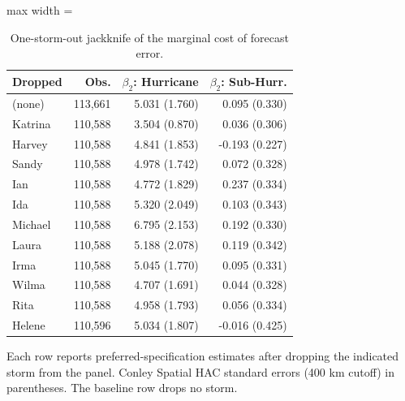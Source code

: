\begin{table}

\caption{One-storm-out jackknife of the marginal cost of forecast error. \label{tab:cost_jackknife}}
\centering
\begin{adjustbox}{max width = \textwidth}
\begin{threeparttable}
\begin{tabular}[t]{lrrr}
\toprule
Dropped & Obs. & $\beta_2$: Hurricane & $\beta_2$: Sub-Hurr.\\
\midrule
(none) & 113,661 & 5.031 (1.760) & 0.095 (0.330)\\
Katrina & 110,588 & 3.504 (0.870) & 0.036 (0.306)\\
Harvey & 110,588 & 4.841 (1.853) & -0.193 (0.227)\\
Sandy & 110,588 & 4.978 (1.742) & 0.072 (0.328)\\
Ian & 110,588 & 4.772 (1.829) & 0.237 (0.334)\\
Ida & 110,588 & 5.320 (2.049) & 0.103 (0.343)\\
Michael & 110,588 & 6.795 (2.153) & 0.192 (0.330)\\
Laura & 110,588 & 5.188 (2.078) & 0.119 (0.342)\\
Irma & 110,588 & 5.045 (1.770) & 0.095 (0.331)\\
Wilma & 110,588 & 4.707 (1.691) & 0.044 (0.328)\\
Rita & 110,588 & 4.958 (1.793) & 0.056 (0.334)\\
Helene & 110,596 & 5.034 (1.807) & -0.016 (0.425)\\
\bottomrule
\end{tabular}
\begin{tablenotes}
\small
\item Each row reports preferred-specification estimates after dropping the indicated storm from the panel. Conley Spatial HAC standard errors (400 km cutoff) in parentheses. The baseline row drops no storm.
\end{tablenotes}
\end{threeparttable}
\end{adjustbox}
\end{table}
